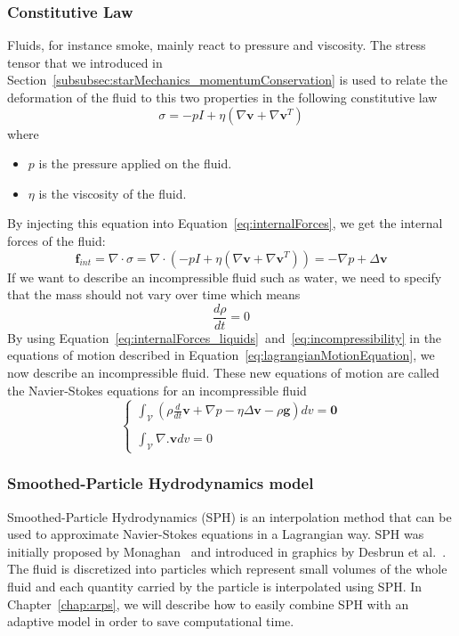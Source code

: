 \subsubsection{Constitutive Law}
Fluids, for instance smoke, mainly react to pressure and viscosity.
The stress tensor that we introduced in Section~\ref{subsubsec:starMechanics_momentumConservation} is used to relate the deformation of the fluid to this two properties in the following constitutive law
\begin{equation}
\label{eq:fluidConstitutiveLaw}
\sigma = -pI + \eta \left( \nabla \mathbf{v} + \nabla \mathbf{v}^{T} \right)
\end{equation}
where
\begin{itemize}
	\item $p$ is the pressure applied on the fluid.
	\item $\eta$ is the viscosity of the fluid.
\end{itemize}
By injecting this equation into Equation~\eqref{eq:internalForces}, we get the internal forces of the fluid:
\begin{equation}
\label{eq:internalForces_liquids}
\mathbf{f}_{int} = \nabla \cdot \sigma = \nabla \cdot \left( -pI + \eta \left( \nabla \mathbf{v} + \nabla \mathbf{v}^{T} \right) \right) = -\nabla p + \Delta \mathbf{v}
\end{equation}
If we want to describe an incompressible fluid such as water, we need to specify that the mass should not vary over time which means
\begin{equation}
\label{eq:incompressibility}
\frac{d\rho}{dt} = 0
\end{equation}
By using Equation~\eqref{eq:internalForces_liquids}~and~\eqref{eq:incompressibility} in the equations of motion described in Equation~\eqref{eq:lagrangianMotionEquation}, we now describe an incompressible fluid. These new equations of motion are called the Navier-Stokes equations for an incompressible fluid
\begin{equation}
\label{eq:navierStokes}
\left\lbrace
\begin{array}{ll}
\displaystyle \int_{\mathcal{V}} \left( \rho \frac{d}{dt} \mathbf{v} + \nabla p - \eta \Delta \mathbf{v} - \rho \mathbf{g} \right)dv = \mathbf{0}\\ \\
\displaystyle \int_{\mathcal{V}} \nabla. \mathbf{v} dv = 0
\end{array}
\right.
\end{equation}
\subsubsection{Smoothed-Particle Hydrodynamics model}
\label{subsubsec:starSPH}
Smoothed-Particle Hydrodynamics (SPH) is an interpolation method that can be used to approximate Navier-Stokes equations in a Lagrangian way. 
SPH was initially proposed by Monaghan~\cite{Monaghan1992} and introduced in graphics by Desbrun et al.~\cite{Desbrun1999}.
The fluid is discretized into particles which represent small volumes of the whole fluid and each quantity carried by the particle is interpolated using SPH.
In Chapter~\ref{chap:arps}, we will describe how to easily combine SPH with an adaptive model in order to save computational time.
